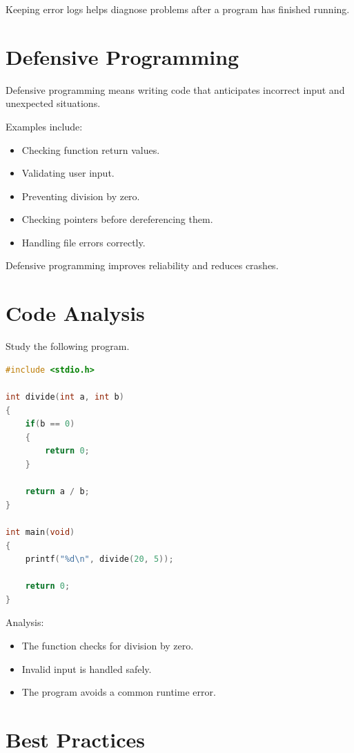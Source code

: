 \documentclass[12pt,openany]{book}
\begin{document}
Keeping error logs helps diagnose problems after a program has finished running.

\section{Defensive Programming}

Defensive programming means writing code that anticipates incorrect input and unexpected situations.

Examples include:

\begin{itemize}
    \item Checking function return values.
    \item Validating user input.
    \item Preventing division by zero.
    \item Checking pointers before dereferencing them.
    \item Handling file errors correctly.
\end{itemize}

Defensive programming improves reliability and reduces crashes.

\section{Code Analysis}

Study the following program.

\begin{lstlisting}[language=C]
#include <stdio.h>

int divide(int a, int b)
{
    if(b == 0)
    {
        return 0;
    }

    return a / b;
}

int main(void)
{
    printf("%d\n", divide(20, 5));

    return 0;
}
\end{lstlisting}

Analysis:

\begin{itemize}
    \item The function checks for division by zero.
    \item Invalid input is handled safely.
    \item The program avoids a common runtime error.
\end{itemize}

\section{Best Practices}
\end{document}
